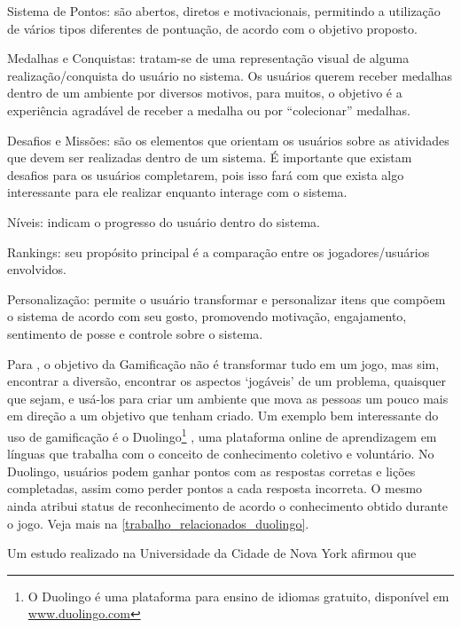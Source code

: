 \begin{alineascomponto}
	\item Sistema de Pontos: são abertos, diretos e motivacionais, permitindo a utilização de vários tipos diferentes de pontuação, de acordo com o objetivo proposto.
	\item Medalhas e Conquistas: tratam-se de uma representação visual de alguma realização/conquista do usuário no sistema. Os usuários querem receber medalhas dentro de um ambiente por diversos 
 motivos, para muitos, o objetivo é a experiência agradável de receber a medalha ou por “colecionar” medalhas.
	\item Desafios e Missões: são os elementos que orientam os usuários sobre as atividades que devem ser realizadas dentro de um sistema. É importante que existam desafios 
para os usuários completarem, pois isso fará com que exista algo interessante para ele realizar enquanto interage com o sistema.
	\item N\'iveis: indicam o progresso do usuário dentro do sistema. 
	\item Rankings: seu propósito principal é a comparação entre os jogadores/usuários envolvidos.
	\item Personalização: permite o usuário transformar e personalizar itens que compõem o sistema de acordo com seu gosto, promovendo motivação, engajamento, sentimento de posse e controle sobre 
o sistema. 
\end{alineascomponto}


Para , o objetivo da Gamificação não é transformar tudo em um jogo, mas sim, encontrar a diversão, encontrar os aspectos `jogáveis' de um problema, quaisquer que 
sejam, e usá-los para criar um ambiente que mova as pessoas um pouco mais em direção a um objetivo que tenham criado. Um exemplo bem interessante do uso de gamificação é o Duolingo\footnote{O 
Duolingo é uma plataforma para ensino de idiomas gratuito, dispon\'ivel em \url{www.duolingo.com} } \cite{von2013duolingo}, uma plataforma online de aprendizagem em línguas que trabalha com o 
conceito de conhecimento coletivo e voluntário. No Duolingo, usuários podem ganhar pontos com as respostas corretas e lições completadas, assim como perder pontos a cada resposta incorreta. O mesmo 
ainda atribui status de reconhecimento de acordo o conhecimento obtido durante o jogo. Veja mais na \autoref{trabalho_relacionados_duolingo}.

Um estudo realizado na Universidade da Cidade de Nova York afirmou que 

